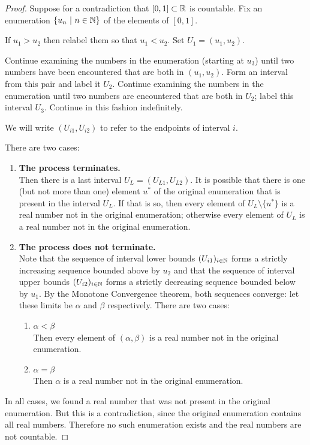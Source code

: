\begin{proof}
  Suppose for a contradiction that $[0, 1] \subset \mathbb{R}$ is countable. Fix an enumeration $\{u_n ~|~ n \in \mathbb{N}\}$
  of the elements of $[0, 1]$.

  If $u_1 > u_2$ then relabel them so that $u_1 < u_2$. Set $U_1 = (u_1, u_2)$.

  Continue examining the numbers in the enumeration (starting at $u_3$) until two numbers have been encountered
  that are both in $(u_1, u_2)$. Form an interval from this pair and label it $U_2$. Continue examining the
  numbers in the enumeration until two numbers are encountered that are both in $U_2$; label this
  interval $U_3$. Continue in this fashion indefinitely.

  We will write $(U_{i1}, U_{i2})$ to refer to the endpoints of interval $i$.

  There are two cases:

  \begin{enumerate}
  \item {\bf The process terminates.}\\
    Then there is a last interval $U_L = (U_{L1}, U_{L2})$. It is possible that there is one (but not more than
    one) element $u^*$ of the original enumeration that is present in the interval $U_L$. If that is so, then
    every element of $U_L \setminus \{u^*\}$ is a real number not in the original enumeration; otherwise every
    element of $U_L$ is a real number not in the original enumeration.

  \item {\bf The process does not terminate.}\\
    Note that the sequence of interval lower bounds $(U_{i1})_{i\in\mathbb{N}}$ forms a strictly increasing sequence
    bounded above by $u_2$ and that the sequence of interval upper bounds $(U_{i2})_{i\in\mathbb{N}}$ forms a strictly
    decreasing sequence bounded below by $u_1$. By the Monotone Convergence theorem, both sequences converge:
    let these limits be $\alpha$ and $\beta$ respectively. There are two cases:
    \begin{enumerate}
    \item {\bf $\alpha < \beta$}\\
      Then every element of $(\alpha, \beta)$ is a real number not in the original enumeration.
    \item {\bf $\alpha = \beta$}\\
      Then $\alpha$ is a real number not in the original enumeration.
    \end{enumerate}
  \end{enumerate}

  In all cases, we found a real number that was not present in the original enumeration. But this is a
  contradiction, since the original enumeration contains all real numbers. Therefore no such enumeration exists
  and the real numbers are not countable.
\end{proof}
